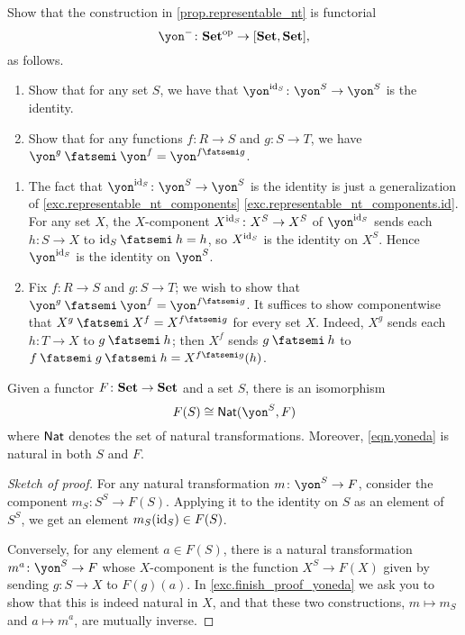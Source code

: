 \documentclass[Book-Poly]{subfiles}
\begin{document}
\begin{exercise} \label{exc.representable_nt_functorial}
Show that the construction in \cref{prop.representable_nt} is functorial
\begin{equation} \label{eqn.yoneda_embedding}
\yon^-\colon\smset\op\to[\smset,\smset],
\end{equation}
as follows.
\begin{enumerate}
	\item Show that for any set $S$, we have that $\yon^{\id_S}\colon\yon^S\to\yon^S$ is the identity.
	\item Show that for any functions $f\colon R\to S$ and $g\colon S\to T$, we have $\yon^g\then\yon^f=\yon^{f\then g}$.
\end{enumerate}

\begin{solution}
\begin{enumerate}
    \item The fact that $\yon^{\id_S}\colon\yon^S\to\yon^S$ is the identity is just a generalization of \cref{exc.representable_nt_components} \cref{exc.representable_nt_components.id}.
    For any set $X$, the $X$-component $X^{\mathrm{id}_S} \colon X^S \to X^S$ of $\yon^{\id_S}$ sends each $h \colon S \to X$ to $\id_S \then h = h$, so $X^{\mathrm{id}_S}$ is the identity on $X^S$.
    Hence $\yon^{\id_S}$ is the identity on $\yon^S$.
    \item Fix $f \colon R \to S$ and $g \colon S \to T$; we wish to show that $\yon^g \then \yon^f = \yon^{f \then g}$.
    It suffices to show componentwise that $X^g \then X^f = X^{f \then g}$ for every set $X$.
    Indeed, $X^g$ sends each $h \colon T \to X$ to $g \then h$; then $X^f$ sends $g \then h$ to $f \then g \then h = X^{f \then g}(h)$.
\end{enumerate}
\end{solution}
\end{exercise}

\begin{lemma}\label{lemma.yoneda}
Given a functor $F\colon\mathbf{Set}\to\mathbf{Set}$ and a set $S$, there is an isomorphism
\begin{equation}\label{eqn.yoneda}
F(S)\iso\nat(\yon^S,F)
\end{equation}
where $\mathsf{Nat}$ denotes the set of natural transformations. Moreover, \eqref{eqn.yoneda} is natural in both $S$ and $F$.
\end{lemma}
\begin{proof}[Sketch of proof]
For any natural transformation $m\colon\yon^S\to F$, consider the component $m_S\colon S^S\to F(S)$. Applying it to the identity on $S$ as an element of $S^S$, we get an element $m_S(\mathrm{id}_S)\in F(S)$.

Conversely, for any element $a\in F(S)$, there is a natural transformation $m^a\colon\yon^S\to F$ whose $X$-component is the function $X^S\to F(X)$ given by sending $g\colon S\to X$ to $F(g)(a)$. In \cref{exc.finish_proof_yoneda} we ask you to show that this is indeed natural in $X$, and that these two constructions, $m\mapsto m_S$ and $a\mapsto m^a$, are mutually inverse.
\end{proof}
\end{document}
